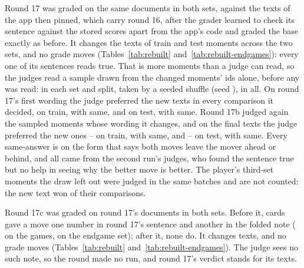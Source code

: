 \documentclass[11pt]{article}
\begin{document}
Round 17 was graded on the same documents in both sets, against the texts of the app then pinned,
which carry round 16, after the grader learned to check its sentence against the stored scores
apart from the app's code and graded the base exactly as before. It changes the texts of
\RoundSeventeenChangedTrain{} train and \RoundSeventeenChangedTest{} test moments across the two
sets, and no grade moves (Tables~\ref{tab:rebuilt} and~\ref{tab:rebuilt-endgames}): every one of its sentences reads true. That is
more moments than a judge can read, so the judges read a sample drawn from the changed moments' ids
alone, before any was read: in each set and split, \RoundSeventeenPer{} taken by a seeded shuffle
(seed \RoundSeventeenSeed), \RoundSeventeenSampled{} in all. On round 17's first wording the judge
preferred the new texts in every comparison it decided, \RoundSeventeenFirstTrainNew{} on train,
with \RoundSeventeenFirstTrainSame{} same, and \RoundSeventeenFirstTestNew{} on test, with
\RoundSeventeenFirstTestSame{} same. Round 17b judged again the \RoundSeventeenRejudged{} sampled
moments whose wording it changes, and on the final texts the judge preferred the new ones
\RoundSeventeenTrainNew--\RoundSeventeenTrainOld{} on train, with \RoundSeventeenTrainSame{} same,
and \RoundSeventeenTestNew--\RoundSeventeenTestOld{} on test, with \RoundSeventeenTestSame{} same.
Every same-answer is on the form that says both moves leave the mover ahead or behind, and all came
from the second run's judges, who found the sentence true but no help in seeing why the better move
is better. The player's \RoundSeventeenExtras{} third-set moments the draw left out were judged in
the same batches and are not counted: the new text won \RoundSeventeenExtrasNew{} of their
\RoundSeventeenExtrasN{} comparisons.

Round 17c was graded on round 17's documents in both sets. Before it, \RoundSeventeenCDefects{}
cards gave a move one number in round 17's sentence and another in the folded note
(\RoundSeventeenCDefectsGames{} on the \Games{} games, \RoundSeventeenCDefectsEnd{} on the endgame
set); after it, none do. It changes \RoundSeventeenCChanged{} texts, and no grade moves
(Tables~\ref{tab:rebuilt} and~\ref{tab:rebuilt-endgames}). The judge sees no such note, so the round made no run, and round 17's
verdict stands for its texts.
\end{document}
